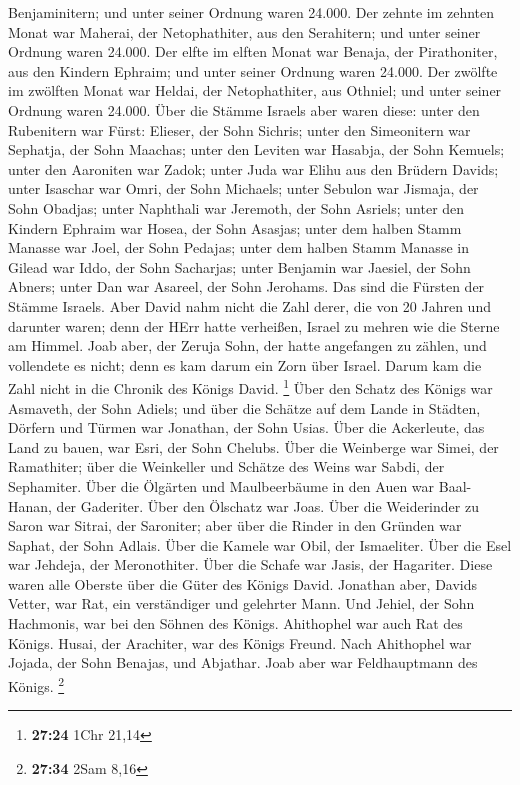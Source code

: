 Benjaminitern; und unter seiner Ordnung waren 24.000.  Der
zehnte im zehnten Monat war Maherai, der Netophathiter, aus den
Serahitern; und unter seiner Ordnung waren 24.000.  Der
elfte im elften Monat war Benaja, der Pirathoniter, aus den Kindern
Ephraim; und unter seiner Ordnung waren 24.000.  Der
zwölfte im zwölften Monat war Heldai, der Netophathiter, aus Othniel;
und unter seiner Ordnung waren 24.000.  Über die Stämme
Israels aber waren diese: unter den Rubenitern war Fürst: Elieser, der
Sohn Sichris; unter den Simeonitern war Sephatja, der Sohn Maachas;
 unter den Leviten war Hasabja, der Sohn Kemuels; unter den
Aaroniten war Zadok;  unter Juda war Elihu aus den Brüdern
Davids; unter Isaschar war Omri, der Sohn Michaels;  unter
Sebulon war Jismaja, der Sohn Obadjas; unter Naphthali war Jeremoth, der
Sohn Asriels;  unter den Kindern Ephraim war Hosea, der
Sohn Asasjas; unter dem halben Stamm Manasse war Joel, der Sohn Pedajas;
 unter dem halben Stamm Manasse in Gilead war Iddo, der
Sohn Sacharjas; unter Benjamin war Jaesiel, der Sohn Abners;
 unter Dan war Asareel, der Sohn Jerohams. Das sind die
Fürsten der Stämme Israels.  Aber David nahm nicht die Zahl
derer, die von 20 Jahren und darunter waren; denn der HErr hatte
verheißen, Israel zu mehren wie die Sterne am Himmel.  Joab
aber, der Zeruja Sohn, der hatte angefangen zu zählen, und vollendete es
nicht; denn es kam darum ein Zorn über Israel. Darum kam die Zahl nicht
in die Chronik des Königs David. \footnote{\textbf{27:24} 1Chr 21,14}
 Über den Schatz des Königs war Asmaveth, der Sohn Adiels;
und über die Schätze auf dem Lande in Städten, Dörfern und Türmen war
Jonathan, der Sohn Usias.  Über die Ackerleute, das Land zu
bauen, war Esri, der Sohn Chelubs.  Über die Weinberge war
Simei, der Ramathiter; über die Weinkeller und Schätze des Weins war
Sabdi, der Sephamiter.  Über die Ölgärten und Maulbeerbäume
in den Auen war Baal-Hanan, der Gaderiter. Über den Ölschatz war Joas.
 Über die Weiderinder zu Saron war Sitrai, der Saroniter;
aber über die Rinder in den Gründen war Saphat, der Sohn Adlais.
 Über die Kamele war Obil, der Ismaeliter. Über die Esel
war Jehdeja, der Meronothiter.  Über die Schafe war Jasis,
der Hagariter. Diese waren alle Oberste über die Güter des Königs David.
 Jonathan aber, Davids Vetter, war Rat, ein verständiger
und gelehrter Mann. Und Jehiel, der Sohn Hachmonis, war bei den Söhnen
des Königs.  Ahithophel war auch Rat des Königs. Husai, der
Arachiter, war des Königs Freund.  Nach Ahithophel war
Jojada, der Sohn Benajas, und Abjathar. Joab aber war Feldhauptmann des
Königs. \footnote{\textbf{27:34} 2Sam 8,16}

